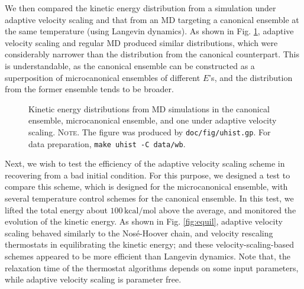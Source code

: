 \documentclass[reprint]{revtex4-1}
\newcommand{\note}[1]{{\color{DarkGreen}\footnotesize \textsc{Note.} #1}}
\begin{document}
We then compared the kinetic energy
distribution from a simulation under adaptive velocity scaling
and that from an MD targeting a canonical ensemble
at the same temperature (using Langevin dynamics).
%
As shown in Fig. \ref{fig:uhist},
adaptive velocity scaling and regular MD
produced similar distributions,
which were considerably narrower than the distribution
from the canonical counterpart.
%
This is understandable,
as the canonical ensemble
can be constructed as a superposition
of microcanonical ensembles of different $E$'s,
and the distribution from the former ensemble
tends to be broader.
%
%

\begin{figure}[h]
\begin{center}
  \caption{
    \label{fig:uhist}
    Kinetic energy distributions
    from MD simulations in the canonical ensemble,
    microcanonical ensemble,
    and one under adaptive velocity scaling.
    \note{The figure was produced by \texttt{doc/fig/uhist.gp}.
      For data preparation, \texttt{make uhist -C data/wb}.
    }%
  }
\end{center}
\end{figure}


Next, we wish to test
the efficiency of the adaptive velocity scaling scheme
in recovering from a bad initial condition.
%
For this purpose,
we designed a test to compare this scheme, 
which is designed for the microcanonical ensemble,
with several temperature control schemes
for the canonical ensemble.
%
In this test, we lifted the total energy about
$100\,\mathrm{kcal/mol}$ above the average,
and monitored the evolution of the kinetic energy.
%
As shown in Fig. \ref{fig:equil},
adaptive velocity scaling
behaved similarly to
the Nos\'e-Hoover chain\cite{nose1984, nose1984mp, hoover1985, martyna1992},
and velocity rescaling\cite{bussi2007}
thermostats
in equilibrating the kinetic energy;
and these velocity-scaling-based schemes
appeared to be more efficient than Langevin dynamics.
%
Note that, the relaxation time
of the thermostat algorithms
depends on some input parameters,
while adaptive velocity scaling
is parameter free.
\end{document}
